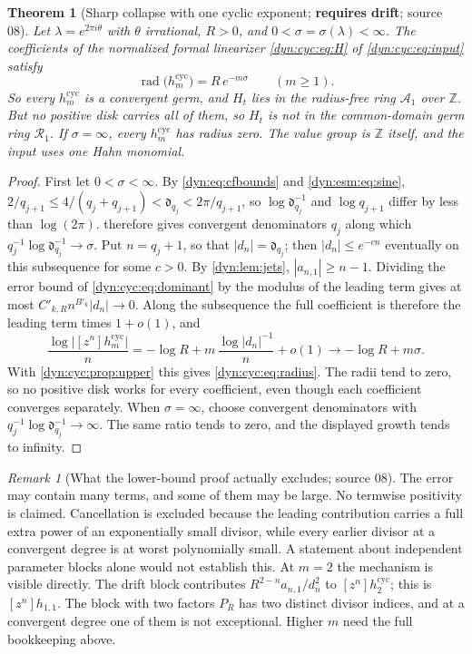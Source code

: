 \documentclass[11pt,letterpaper]{article}
\newtheorem{theorem}{Theorem}[section]
\theoremstyle{definition}
\theoremstyle{remark}
\newtheorem{remark}[remark]{Remark}
\newcommand{\Z}{\mathbb Z}
\newcommand{\rad}{\operatorname{rad}}
\numberwithin{equation}{section}
\begin{document}
\begin{theorem}[Sharp collapse with one cyclic exponent; \textbf{requires
drift}; source 08]\label{dyn:cyc:thm}
Let $\lambda=e^{2\pi i\theta}$ with $\theta$ irrational, $R>0$, and
$0<\sigma=\sigma(\lambda)<\infty$. The coefficients of the normalized
formal linearizer \eqref{dyn:cyc:eq:H} of \eqref{dyn:cyc:eq:input} satisfy
\begin{equation}\label{dyn:cyc:eq:radius}
 \boxed{\;\rad\bigl(h^{\mathrm{cyc}}_m\bigr)=R\,e^{-m\sigma}\qquad(m\ge1).\;}
\end{equation}
So every $h^{\mathrm{cyc}}_m$ is a convergent germ, and $H_t$ lies in the
radius-free ring $\mathcal A_1$ over $\Z$. But no positive disk carries all
of them, so $H_t$ is not in the common-domain germ ring $\mathcal R_1$. If
$\sigma=\infty$, every $h^{\mathrm{cyc}}_m$ has radius zero. The value
group is $\Z$ itself, and the input uses one Hahn monomial.
\end{theorem}
\begin{proof}
First let $0<\sigma<\infty$. By \eqref{dyn:eq:cfbounds} and
\eqref{dyn:esm:eq:sine},
$2/q_{j+1}\le4/(q_j+q_{j+1})<\mathfrak d_{q_j}<2\pi/q_{j+1}$, so
$\log\mathfrak d_{q_j}^{-1}$ and $\log q_{j+1}$ differ by less than
$\log(2\pi)$.
 therefore gives convergent denominators $q_j$ along which
$q_j^{-1}\log\mathfrak d_{q_j}^{-1}\to\sigma$. Put $n=q_j+1$, so that
$|d_n|=\mathfrak d_{q_j}$; then $|d_n|\le e^{-cn}$ eventually on this
subsequence for some $c>0$. By \cref{dyn:lem:jets}, $|a_{n,1}|\ge n-1$.
Dividing the error bound of \eqref{dyn:cyc:eq:dominant} by the modulus of
the leading term gives at most $C'_{k,R}n^{B'_k}|d_n|\to0$. Along the
subsequence the full coefficient is therefore the leading term times
$1+o(1)$, and
\[
 \frac{\log\bigl|[z^{n}]h^{\mathrm{cyc}}_m\bigr|}{n}
 =-\log R+m\,\frac{\log|d_n|^{-1}}{n}+o(1)\longrightarrow-\log R+m\sigma .
\]
With \cref{dyn:cyc:prop:upper} this gives \eqref{dyn:cyc:eq:radius}. The
radii tend to zero, so no positive disk works for every coefficient, even
though each coefficient converges separately. When $\sigma=\infty$, choose
convergent denominators with $q_j^{-1}\log\mathfrak d_{q_j}^{-1}\to\infty$.
The same ratio tends to zero, and the displayed growth tends to infinity.
\end{proof}

\begin{remark}[What the lower-bound proof actually excludes; source 08]
\label{dyn:cyc:rem:excludes}
The error may contain many terms, and some of them may be large. No termwise
positivity is claimed. Cancellation is excluded because the leading
contribution carries a full extra power of an exponentially small divisor,
while every earlier divisor at a convergent degree is at worst polynomially
small. A statement about independent parameter blocks alone would not
establish this. At $m=2$ the mechanism is visible directly. The drift block
contributes $R^{2-n}a_{n,1}/d_n^{2}$ to $[z^{n}]h^{\mathrm{cyc}}_2$; this is
$[z^{n}]h_{1,1}$. The block with two factors $P_R$ has two distinct divisor
indices, and at a convergent degree one of them is not exceptional. Higher
$m$ need the full bookkeeping above.
\end{remark}
\end{document}
